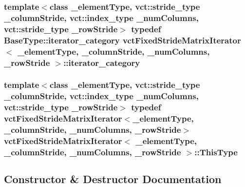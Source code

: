 \subsubsection[{iterator\+\_\+category}]{\setlength{\rightskip}{0pt plus 5cm}template$<$class \+\_\+element\+Type, vct\+::stride\+\_\+type \+\_\+column\+Stride, vct\+::index\+\_\+type \+\_\+num\+Columns, vct\+::stride\+\_\+type \+\_\+row\+Stride$>$ typedef Base\+Type\+::iterator\+\_\+category {\bf vct\+Fixed\+Stride\+Matrix\+Iterator}$<$ \+\_\+element\+Type, \+\_\+column\+Stride, \+\_\+num\+Columns, \+\_\+row\+Stride $>$\+::{\bf iterator\+\_\+category}}\label{classvct_fixed_stride_matrix_iterator_aa33a65dee36b4ac1f9fb5479ce074742}
\hypertarget{classvct_fixed_stride_matrix_iterator_a99a6088a50b066ba920c9138d7b3a950}{}
\subsubsection[{This\+Type}]{\setlength{\rightskip}{0pt plus 5cm}template$<$class \+\_\+element\+Type, vct\+::stride\+\_\+type \+\_\+column\+Stride, vct\+::index\+\_\+type \+\_\+num\+Columns, vct\+::stride\+\_\+type \+\_\+row\+Stride$>$ typedef {\bf vct\+Fixed\+Stride\+Matrix\+Iterator}$<$\+\_\+element\+Type, \+\_\+column\+Stride, \+\_\+num\+Columns, \+\_\+row\+Stride$>$ {\bf vct\+Fixed\+Stride\+Matrix\+Iterator}$<$ \+\_\+element\+Type, \+\_\+column\+Stride, \+\_\+num\+Columns, \+\_\+row\+Stride $>$\+::{\bf This\+Type}}\label{classvct_fixed_stride_matrix_iterator_a99a6088a50b066ba920c9138d7b3a950}


\subsection{Constructor \& Destructor Documentation}
\hypertarget{classvct_fixed_stride_matrix_iterator_a20b5c57957f2ad4ea87d21c8b5c97a8a}{}
